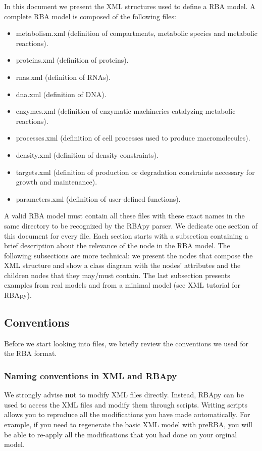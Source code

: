 \documentclass[12pt]{scrartcl}
\begin{document}
In this document we present the XML structures used to define a RBA model.
A complete RBA model is composed of the following files:
\begin{itemize}
  \item metabolism.xml
  (definition of compartments, metabolic species and metabolic reactions).
  \item proteins.xml (definition of proteins).
  \item rnas.xml (definition of RNAs).
  \item dna.xml (definition of DNA).
  \item enzymes.xml
  (definition of enzymatic machineries catalyzing metabolic reactions).
  \item processes.xml
  (definition of cell processes used to produce macromolecules).
  \item density.xml (definition of density constraints).
  \item targets.xml
  (definition of production or degradation constraints necessary for growth and maintenance).
  \item parameters.xml
  (definition of user-defined functions).
\end{itemize}

A valid RBA model must contain all these files with these exact names in
the same directory to be recognized by the RBApy parser.
We dedicate one section of this document for every file.
Each section starts with a subsection containing a brief description
about the relevance of the node in the RBA model.
The following subsections are more technical:
we present the nodes that compose the XML structure
and show a class diagram with the nodes' attributes
and the children nodes that they may/must contain.
The last subsection presents examples from real models and from a minimal
model (see XML tutorial for RBApy).

\subsection{Conventions}

Before we start looking into files, we briefly review the conventions we used for the RBA format.

\subsubsection{Naming conventions in XML and RBApy}

We strongly advise \textbf{not} to modify XML files directly.
Instead, RBApy can be used to access the XML files and modify them through scripts.
Writing scripts allows you to reproduce all the modifications you have made automatically.
For example, if you need to regenerate the basic XML model with preRBA, you will be able
to re-apply all the modifications that you had done on your orginal model.
\end{document}
